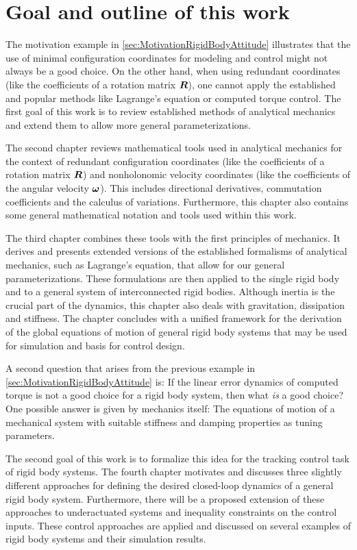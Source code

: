 \clearpage
\section{Goal and outline of this work}
The motivation example in \autoref{sec:MotivationRigidBodyAttitude} illustrates that the use of minimal configuration coordinates for modeling and control might not always be a good choice.
On the other hand, when using redundant coordinates (like the coefficients of a rotation matrix $\boldsymbol{R}$), one cannot apply the established and popular methods like Lagrange's equation or computed torque control.
The first goal of this work is to review established methods of analytical mechanics and extend them to allow more general parameterizations.

The second chapter reviews mathematical tools used in analytical mechanics for the context of redundant configuration coordinates (like the coefficients of a rotation matrix $\boldsymbol{R}$) and nonholonomic velocity coordinates (like the coefficients of the angular velocity $\boldsymbol{\omega}$).
This includes directional derivatives, commutation coefficients and the calculus of variations.
Furthermore, this chapter also contains some general mathematical notation and tools used within this work.

The third chapter combines these tools with the first principles of mechanics.
It derives and presents extended versions of the established formalisms of analytical mechanics, such as Lagrange's equation, that allow for our general parameterizations.
These formulations are then applied to the single rigid body and to a general system of interconnected rigid bodies.
Although inertia is the crucial part of the dynamics, this chapter also deals with gravitation, dissipation and stiffness.
The chapter concludes with a unified framework for the derivation of the global equations of motion of general rigid body systems that may be used for simulation and basis for control design.

A second question that arises from the previous example in \autoref{sec:MotivationRigidBodyAttitude} is:
If the linear error dynamics of computed torque is not a good choice for a rigid body system, then what \textit{is} a good choice?
One possible answer is given by mechanics itself: The equations of motion of a mechanical system with suitable stiffness and damping properties as tuning parameters.

The second goal of this work is to formalize this idea for the tracking control task of rigid body systems.
The fourth chapter motivates and discusses three slightly different approaches for defining the desired closed-loop dynamics of a general rigid body system.
Furthermore, there will be a proposed extension of these approaches to underactuated systems and inequality constraints on the control inputs.
These control approaches are applied and discussed on several examples of rigid body systems and their simulation results.

